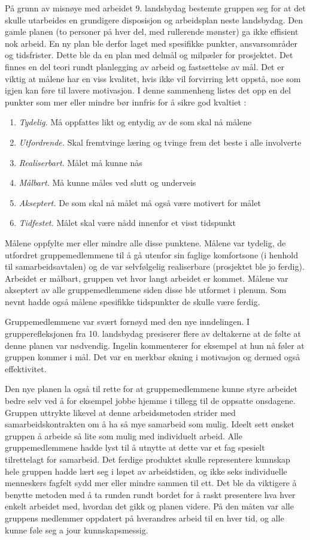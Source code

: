 På grunn av misnøye med arbeidet 9. landsbydag bestemte gruppen seg for at det skulle utarbeides en grundigere disposisjon og arbeidsplan neste landsbydag.
Den gamle planen (to personer på hver del, med rullerende mønster) ga ikke effisient nok arbeid.
En ny plan ble derfor laget med spesifikke punkter, ansvarsområder og tidsfrister.
Dette ble da en plan med delmål og milpæler for prosjektet.
Det finnes en del teori rundt planlegging av arbeid og fastsettelse av mål.
Det er viktig at målene har en viss kvalitet, hvis ikke vil forvirring lett oppstå, noe som igjen kan føre til lavere motivasjon.
I denne sammenheng listes det opp en del punkter som mer eller mindre bør innfris for å sikre god kvaltiet \cite{prosjekteringsledelse}:
\begin{enumerate}
\item \textit{Tydelig.} Må oppfattes likt og entydig av de som skal nå målene
\item \textit{Utfordrende.} Skal fremtvinge læring og tvinge frem det beste i alle involverte
\item \textit{Realiserbart.} Målet må kunne nås
\item \textit{Målbart.} Må kunne måles ved slutt og underveis
\item \textit{Akseptert.} De som skal nå målet må også være motivert for målet
\item \textit{Tidfestet.} Målet skal være nådd innenfor et visst tidspunkt
\end{enumerate}
Målene oppfylte mer eller mindre alle disse punktene.
Målene var tydelig, de utfordret gruppemedlemmene til å gå utenfor sin faglige komfortsone (i henhold til samarbeidsavtalen) og de var selvfølgelig realiserbare (prosjektet ble jo ferdig).
Arbeidet er målbart, gruppen vet hvor langt arbeidet er kommet.
Målene var akseptert av alle gruppemedlemmene siden disse ble utformet i plenum.
Som nevnt hadde også målene spesifikke tidspunkter de skulle være ferdig. 

Gruppemedlemmene var svært fornøyd med den nye inndelingen.
I grupperefleksjonen fra 10. landsbydag presiserer flere av deltakerne at de følte at denne planen var nødvendig.
Ingelin kommenterer for eksempel at hun nå føler at gruppen kommer i mål.
Det var en merkbar økning i motivasjon og dermed også effektivitet.

Den nye planen la også til rette for at gruppemedlemmene kunne styre arbeidet bedre selv ved å for eksempel jobbe hjemme i tillegg til de oppsatte onsdagene.
Gruppen uttrykte likevel at denne arbeidsmetoden strider med samarbeidskontrakten om å ha så mye samarbeid som mulig.
Ideelt sett ønsket gruppen å arbeide så lite som mulig med individuelt arbeid.
Alle gruppemedlemmene hadde lyst til å utnytte at dette var et fag spesielt tilrettelagt for samarbeid.
Det ferdige produktet skulle representere kunnskap hele gruppen hadde lært seg i løpet av arbeidstiden, og ikke seks individuelle menneskers fagfelt sydd mer eller mindre sammen til ett.
Det ble da viktigere å benytte metoden med å ta runden rundt bordet for å raskt presentere hva hver enkelt arbeidet med, hvordan det gikk og planen videre.
På den måten var alle gruppens medlemmer oppdatert på hverandres arbeid til en hver tid, og alle kunne føle seg a jour kunnskapsmessig.

